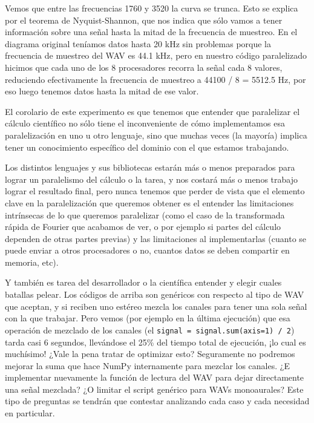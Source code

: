 Vemos que entre las frecuencias 1760 y 3520 la curva se trunca. Esto se explica por el teorema de Nyquist-Shannon, que nos indica que sólo vamos a tener información sobre una señal hasta la mitad de la frecuencia de muestreo. En el diagrama original teníamos datos hasta 20 kHz sin problemas porque la frecuencia de muestreo del WAV es 44.1 kHz, pero en nuestro código paralelizado hicimos que cada uno de los 8 procesadores recorra la señal cada 8 valores, reduciendo efectivamente la frecuencia de muestreo a 44100 / 8 = 5512.5 Hz, por eso luego tenemos datos hasta la mitad de ese valor.

El corolario de este experimento es que tenemos que entender que paralelizar el cálculo científico no sólo tiene el inconveniente de cómo implementamos esa paralelización en uno u otro lenguaje, sino que muchas veces (la mayoría) implica tener un conocimiento específico del dominio con el que estamos trabajando.

Los distintos lenguajes y sus bibliotecas estarán más o menos preparados para lograr un paralelismo del cálculo o la tarea, y nos costará más o menos trabajo lograr el resultado final, pero nunca tenemos que perder de vista que el elemento clave en la paralelización que queremos obtener es el entender las limitaciones intrínsecas de lo que queremos paralelizar (como el caso de la transformada rápida de Fourier que acabamos de ver, o por ejemplo si partes del cálculo dependen de otras partes previas) y las limitaciones al implementarlas (cuanto se puede enviar a otros procesadores o no, cuantos datos se deben compartir en memoria, etc).

Y también es tarea del desarrollador o la científica entender y elegir cuales batallas pelear. Los códigos de arriba son genéricos con respecto al tipo de WAV que aceptan, y si reciben uno estéreo mezcla los canales para tener una sola señal con la que trabajar. Pero vemos (por ejemplo en la última ejecución) que esa operación de mezclado de los canales (el \texttt{signal = signal.sum(axis=1) / 2}) tarda casi 6 segundos, llevándose el 25\% del tiempo total de ejecución, ¡lo cual es muchísimo! ¿Vale la pena tratar de optimizar esto? Seguramente no podremos mejorar la suma que hace NumPy internamente para mezclar los canales. ¿E implementar nuevamente la función de lectura del WAV para dejar directamente una señal mezclada? ¿O limitar el script genérico para WAVs monoaurales? Este tipo de preguntas se tendrán que contestar analizando cada caso y cada necesidad en particular.
